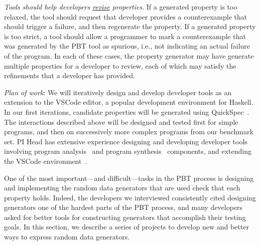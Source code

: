 \textit{Tools should help developers \underline{revise} properties}. If a generated
property is too relaxed, the tool should request that developer provides a
counterexample that should trigger a failure, and then regenerate the property.
If a generated property is too strict, a tool should allow a programmer to mark
a counterexample that was generated by the PBT tool as spurious, i.e., not
indicating an actual failure of the program. In each of these cases, the
property generator may have generate multiple properties for a developer to
review, each of which may satisfy the refinements that a developer has provided.

\textit{Plan of work}: We will iteratively design and develop developer tools as
an extension to the VSCode editor, a popular development environment for
Haskell. In our first iterations, candidate properties will be generated using
QuickSpec~\cite{claessen2010quickspec}. The interactions described above will be
designed and tested first for simple programs, and then on successively more
complex programs from our benchmark set. PI Head has extensive experience
designing and developing developer tools involving program
analysis~\cite{head2018interactive,head2019managing} and program
synthesis~\cite{head2017writing} components, and extending the VSCode
environment~\cite{head2020composing}.   

\label{sec:gen}

One of the most important---and difficult---tasks in the PBT process is
designing and implementing the random data generators that are used check that
each property holds. Indeed, the developers we interviewed consistently
cited designing generators one of the hardest parts of the PBT process, and many
developers asked for better tools for constructing generators that accomplish
their testing goals. In this section, we describe a series of projects
to develop new and better ways to express random data generators.

